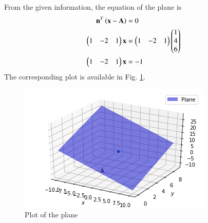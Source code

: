 From the given information, the equation of the plane is 
\begin{align}
\mathbf{n}^T\left(\mathbf{x}-\mathbf{A}\right) &= 0
\\
\begin{pmatrix}1 & -2 & 1\end{pmatrix}{\mathbf{x}} &= \begin{pmatrix}1 & -2 & 1\end{pmatrix}{\ensuremath{\begin{pmatrix}1\\4\\6\end{pmatrix}}}
\\
\begin{pmatrix}1 & -2 & 1\end{pmatrix}{\mathbf{x}} &= -1
\end{align}
The corresponding plot is available in Fig. \ref{linform/2/35/b/Plot of the plane}.
%
\begin{figure}[ht]
\centering
\includegraphics[width=\columnwidth]{solutions/su2021/2/35/b/Plane_plot.PNG}
\caption{Plot of the plane}
\label{linform/2/35/b/Plot of the plane}
\end{figure}
